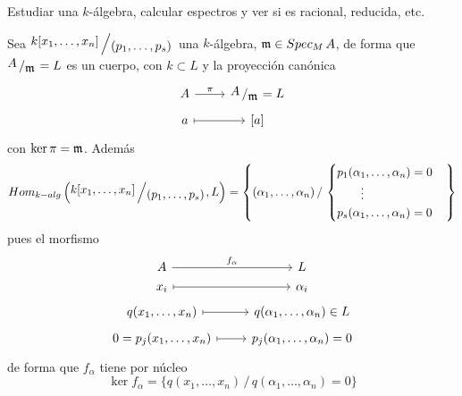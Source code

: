 \begin{ejer}[examen]
    Estudiar una $k$-\'algebra, calcular espectros y ver si es racional, reducida, etc. 

    Sea $\modulo{k[x_1,\ldots, x_n]}{(p_1, \ldots, p_s)}$ una $k$-\'algebra, $\mathfrak{m} \in Spec_M\, A$, de forma que $\modulo{A}{\m} = L$ es un cuerpo, con $k \subset L$ y la proyecci\'on can\'onica
    $$\bt A \rar{\pi} & \modulo{A}{\m} = L \\[-5mm] a \rarmaps & {[a]} \et$$
    con $\ker \pi = \mathfrak{m}$. Adem\'as
    $$Hom_{k-alg} \left(\modulo{k[x_1,\ldots, x_n]}{(p_1, \ldots, p_s)}, L\right) = \left\{ (\alpha_1, \ldots, \alpha_n)  \, /\, \begin{cases}
    p_1 (\alpha_1, \ldots, \alpha_n) =0 \\ \qquad \vdots\\ p_s(\alpha_1, \ldots, \alpha_n) =0    \end{cases}\right\}$$
    pues el morfismo
    $$\bt A \rar{f_{\alpha}} & L \\[-5mm] x_i \rarmaps & \alpha_i \\[-5mm] q(x_1, \ldots, x_n) \rarmaps & q(\alpha_1, \ldots, \alpha_n) \in L \\[-5mm] 0 = p_j(x_1, \ldots, x_n) \rarmaps & p_j(\alpha_1, \ldots, \alpha_n) =0 \et$$
     de forma que $f_{\alpha}$ tiene por n\'ucleo $$\ker f_{\alpha} = \{q(x_1, \ldots, x_n) \, / \, q(\alpha_1, \ldots, \alpha_n) = 0\}$$
\end{ejer}
